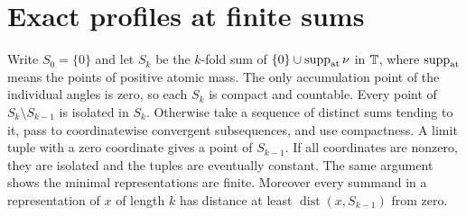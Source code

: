 \documentclass[11pt]{article}
\theoremstyle{remark}\newtheorem{remark}[theorem]{Remark}
\DeclareMathOperator{\dist}{dist}
\begin{document}
\section{Exact profiles at finite sums}\label{sec:finite}
Write $S_0=\{0\}$ and let $S_k$ be the $k$-fold sum of
$\{0\}\cup\operatorname{supp}_{\rm at}\nu$ in $\mathbb T$, where
$\operatorname{supp}_{\rm at}$ means the points of positive atomic mass.
The only accumulation point of the individual angles is zero, so each
$S_k$ is compact and countable. Every point of $S_k\setminus S_{k-1}$
is isolated in $S_k$. Otherwise take a sequence of distinct sums tending
to it, pass to coordinatewise convergent subsequences, and use compactness.
A limit tuple with a zero coordinate gives a point of $S_{k-1}$. If all
coordinates are nonzero, they are isolated and the tuples are eventually
constant. The same argument shows the minimal representations are finite.
Moreover every summand in a representation of $x$ of length $k$ has
distance at least $\dist(x,S_{k-1})$ from zero.
\end{document}
